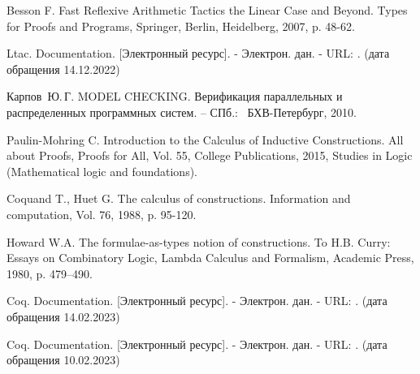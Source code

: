 \documentclass[12pt]{article}
\begin{document}
\begin{thebibliography}{99}
     Besson F. Fast Reflexive Arithmetic Tactics the Linear Case and Beyond. Types for Proofs and Programs, Springer, Berlin, Heidelberg, 2007, p. 48-62.

     Ltac. Documentation. [Электронный ресурс]. - Электрон. дан. - URL: . (дата обращения 14.12.2022)

     Карпов~Ю.\,Г. MODEL CHECKING. Верификация параллельных и распределенных программных систем. -- СПб.: ~БХВ-Петербург, 2010. 

     Paulin-Mohring C. Introduction to the Calculus of Inductive Constructions. All about Proofs, Proofs for All, Vol. 55, College Publications, 2015, Studies
in Logic (Mathematical logic and foundations).

     Coquand T., Huet G. The calculus of constructions.
    Information and computation, Vol. 76, 1988, p. 95-120.
    
     Howard W.A. The formulae-as-types notion of constructions. To H.B. Curry: Essays on Combinatory Logic, Lambda Calculus and Formalism, Academic Press, 1980, p. 479–490.

     Coq. Documentation. [Электронный ресурс]. - Электрон. дан. - URL: . (дата обращения 14.02.2023) 
    
    
    


     
    
    
    
    
    

    

    
    
     Coq. Documentation. [Электронный ресурс]. - Электрон. дан. - URL: . (дата обращения 10.02.2023)


\end{thebibliography}
\end{document}
